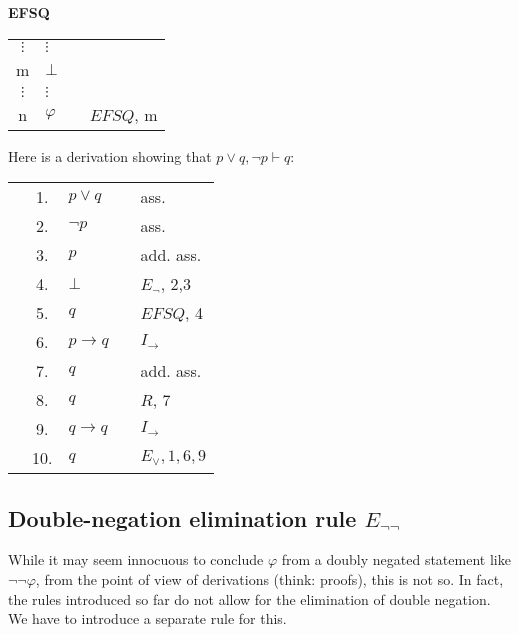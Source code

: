 \documentclass[nobib,nofonts]{tufte-handout}
\newcommand{\EFSQ}{\ensuremath{\mathit{EFSQ}}\xspace}
\begin{document}
\bigskip
\noindent \colorbox{mygray!60}{\centering
  \begin{minipage}[t]{0.35\linewidth}
    \textbf{EFSQ}
  \end{minipage}
  \begin{minipage}[t]{0.55\linewidth}
    \begin{tabular}{clcl}
            $\vdots$ & $\vdots$  & \\
      m              & $\bot$ &  \\
            $\vdots$ & $\vdots$  & \\
      n              & $\varphi$    & & $\EFSQ$, m
    \end{tabular}
  \end{minipage}
}
\bigskip

Here is a derivation showing that $p \vee q, \neg p \vdash q$:

\begin{tabular}{cclcl}
                     & 1. & $p \vee   q$                        & & ass.  \\
                     & 2. & $\neg p$                            & & ass.  \\
  \cline{1-2} \vline & 3. & $p$                                 & & add. ass.  \\
  \vline             & 4. & $\bot$                              & & $E_{\neg}$, 2,3 \\
  \vline             & 5. & $q$                                 & & $\EFSQ$, 4\\ \hline
                     & 6. & $p \rightarrow q $ & & $I_{\rightarrow}$ \\
  \cline{1-2} \vline & 7. & $q$                                 & & add. ass.  \\
  \vline             & 8. & $q$                                 & & $R$, 7\\ \hline
                     & 9. & $q \rightarrow q $ & & $I_{\rightarrow}$ \\
                     & 10. & $q$ & & $E_{\vee}, 1,6,9$ \\
\end{tabular}


\subsection{Double-negation elimination rule $E_{\neg\neg}$}

While it may seem innocuous to conclude $\varphi$ from a doubly negated statement like $\neg\neg\varphi$, from the point of view of derivations (think: proofs), this is not so.
In fact, the rules introduced so far do not allow for the elimination of double negation.
We have to introduce a separate rule for this.
\end{document}
